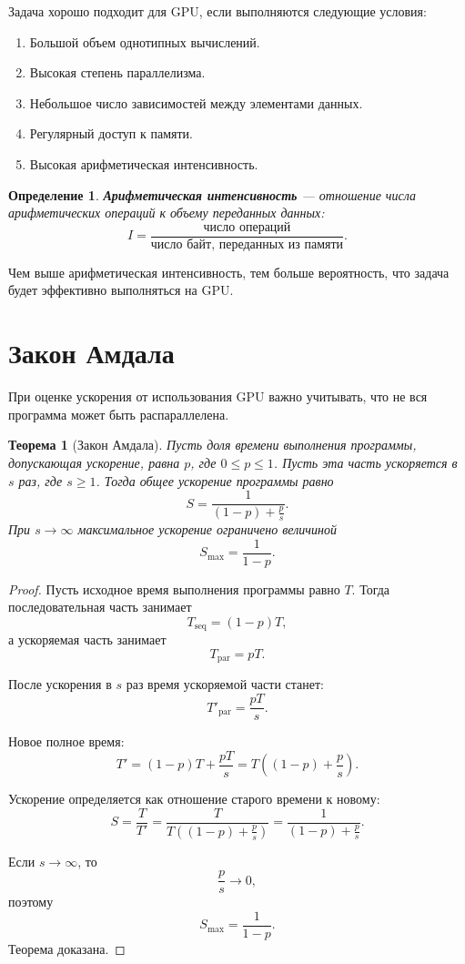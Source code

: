 \documentclass[12pt,a4paper]{article}
\newtheorem{definition}{Определение}
\newtheorem{theorem}{Теорема}
\begin{document}
Задача хорошо подходит для GPU, если выполняются следующие условия:

\begin{enumerate}
    \item Большой объем однотипных вычислений.
    \item Высокая степень параллелизма.
    \item Небольшое число зависимостей между элементами данных.
    \item Регулярный доступ к памяти.
    \item Высокая арифметическая интенсивность.
\end{enumerate}

\begin{definition}
\textbf{Арифметическая интенсивность} --- отношение числа арифметических операций к объему переданных данных:
\[
    I = \frac{\text{число операций}}{\text{число байт, переданных из памяти}}.
\]
\end{definition}

Чем выше арифметическая интенсивность, тем больше вероятность, что задача будет эффективно выполняться на GPU.

\section{Закон Амдала}

При оценке ускорения от использования GPU важно учитывать, что не вся программа может быть распараллелена.

\begin{theorem}[Закон Амдала]
Пусть доля времени выполнения программы, допускающая ускорение, равна $p$, где $0 \le p \le 1$. Пусть эта часть ускоряется в $s$ раз, где $s \ge 1$. Тогда общее ускорение программы равно
\[
    S = \frac{1}{(1-p) + \frac{p}{s}}.
\]
При $s \to \infty$ максимальное ускорение ограничено величиной
\[
    S_{\max} = \frac{1}{1-p}.
\]
\end{theorem}

\begin{proof}
Пусть исходное время выполнения программы равно $T$. Тогда последовательная часть занимает
\[
    T_{\text{seq}} = (1-p)T,
\]
а ускоряемая часть занимает
\[
    T_{\text{par}} = pT.
\]

После ускорения в $s$ раз время ускоряемой части станет:
\[
    T'_{\text{par}} = \frac{pT}{s}.
\]

Новое полное время:
\[
    T' = (1-p)T + \frac{pT}{s}
       = T\left((1-p)+\frac{p}{s}\right).
\]

Ускорение определяется как отношение старого времени к новому:
\[
    S = \frac{T}{T'}
      = \frac{T}{T\left((1-p)+\frac{p}{s}\right)}
      = \frac{1}{(1-p)+\frac{p}{s}}.
\]

Если $s \to \infty$, то
\[
    \frac{p}{s} \to 0,
\]
поэтому
\[
    S_{\max} = \frac{1}{1-p}.
\]
Теорема доказана.
\end{proof}
\end{document}
